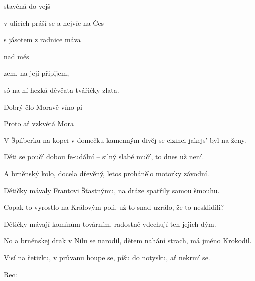 

\zs
{} stavěná do vejš

v ulicích práší se a nejvíc na Čes 

 s jásotem z radnice máva

 nad měs
\ks

\zr
{} zem, na její  připijem,

só na ní hezká děvčata tvářičky  zlata.

Dobrý člo Moravě víno pi

Proto ať vzkvétá Mora 
\kr

\zs
V Špilberku na kopci v domečku kamenným divěj se cizinci jakejs' byl na ženy.

Děti se poučí dobou fe-udální -- silný slabé mučí, to dnes už není.
\ks

\zr\kr

\zs
A brněnský kolo, docela dřevěný, letos prohánělo motorky závodní.

Dětičky mávaly Frantovi Šťastnýmu, na dráze spatřily samou šmouhu.
\ks

\zr\kr

\zs
Copak to vyrostlo na Královým poli, už to snad uzrálo, že to nesklidili?

Dětičky mávají komínům továrním, radostně vdechují ten jejich dým.
\ks

\zr\kr

\zs
No a brněnskej drak v Nilu se narodil, dětem nahání strach, má jméno Krokodil.

Visí na řetizku, v průvanu houpe se, píšu do notysku, ať nekrmí se.
\ks

\zr\kr

Rec:  

 

 

  

 


\zr\kr

\kp
